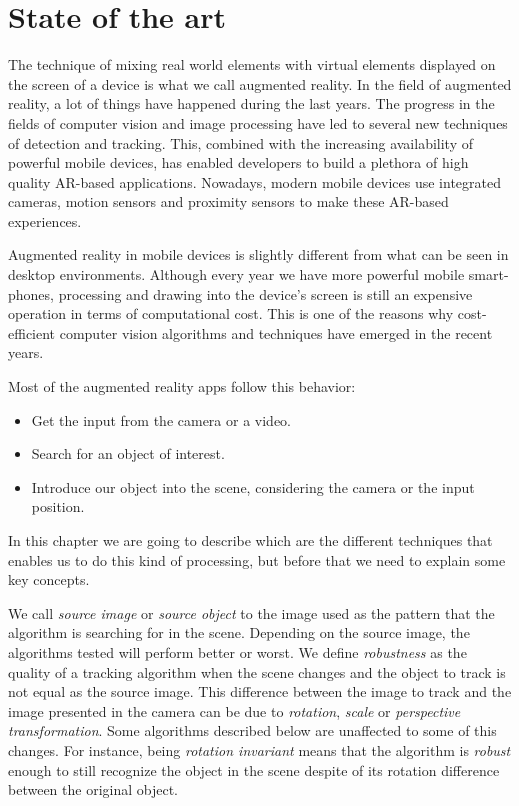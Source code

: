 \chapter{State of the art}
\label{chap:sota}
The technique of
mixing real world elements with virtual elements displayed on the screen of a
device is what we call augmented reality. In the field of augmented reality, a
lot of things have happened during the last years. The progress in the fields
of computer vision and image processing have led to several new techniques of
detection and tracking. This, combined with the increasing availability of
powerful mobile devices, has enabled developers to build a plethora of high
quality AR-based applications. Nowadays, modern mobile devices use integrated
cameras, motion sensors and proximity sensors to make these AR-based experiences. 

Augmented reality in mobile devices is slightly different from what can be seen in
desktop environments. Although every year we have more powerful mobile
smart-phones, processing and drawing into the device's screen is still an 
expensive operation in terms of computational cost. This is one of the reasons why
cost-efficient computer vision algorithms and techniques have emerged in the recent
years. 

Most of the augmented reality apps follow this behavior:
\begin{itemize}
\item Get the input from the camera or a video.
\item Search for an object of interest.
\item Introduce our object into the scene, considering the camera or the input position.
\end{itemize}

In this chapter we are going to describe which are the different techniques
that enables us to do this kind of processing, but before that we need to
explain some key concepts. 

We call \emph{source image} or \emph{source object} to the image used as the pattern
that the algorithm is searching for in the scene. Depending on the source image, the
algorithms tested will perform better or worst. We define \emph{robustness} as the
quality of a tracking 
algorithm when the scene changes and the object to track is not equal as the
source image. This difference between the image to track and the image
presented in the camera can be due to \emph{rotation}, \emph{scale} or
\emph{perspective transformation}. Some algorithms described below are
unaffected to some of this changes. For instance, being \emph{rotation
  invariant} means that the algorithm is \emph{robust} enough to still
recognize the object in the scene despite of its rotation difference between
the original object.

